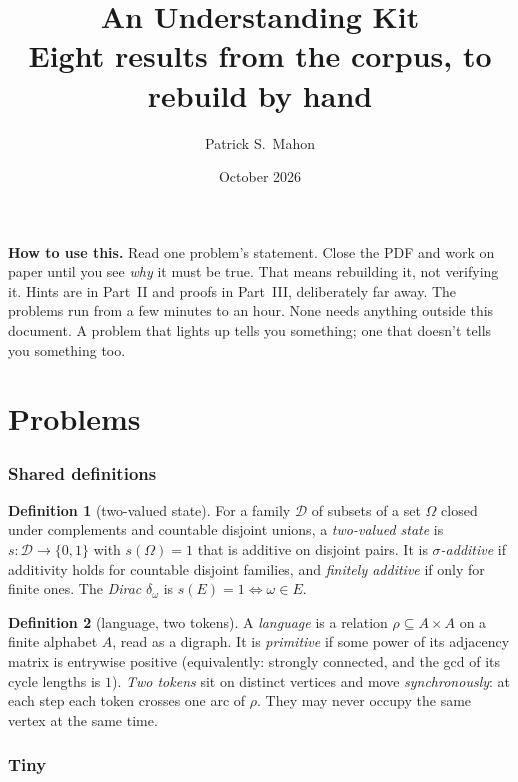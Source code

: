 \documentclass[11pt]{article}
\title{An Understanding Kit\\[2pt]\large Eight results from the corpus, to rebuild by hand}
\author{Patrick S.\ Mahon}
\date{October 2026}
\theoremstyle{definition}
\newtheorem{definition}{Definition}
\theoremstyle{remark}
\newcommand{\bp}[1]{\begin{mdframed}[backgroundcolor=black!4,linewidth=0.4pt]#1\end{mdframed}}
\begin{document}
\maketitle

\bp{\textbf{How to use this.} Read one problem's statement. Close the PDF and
work on paper until you see \emph{why} it must be true. That means rebuilding
it, not verifying it. Hints are in Part~II and proofs in Part~III, deliberately
far away. The problems run from a few minutes to an hour. None needs anything
outside this document. A problem that lights up tells you something; one that
doesn't tells you something too.}

\tableofcontents

\part{Problems}

\section*{Shared definitions}

\begin{definition}[two-valued state]
For a family $\mathcal D$ of subsets of a set $\Omega$ closed under complements
and countable disjoint unions, a \emph{two-valued state} is $s:\mathcal
D\to\{0,1\}$ with $s(\Omega)=1$ that is additive on disjoint pairs. It is
\emph{$\sigma$-additive} if additivity holds for countable disjoint families, and
\emph{finitely additive} if only for finite ones. The \emph{Dirac} $\delta_\omega$
is $s(E)=1\iff\omega\in E$.
\end{definition}

\begin{definition}[language, two tokens]
A \emph{language} is a relation $\rho\subseteq A\times A$ on a finite alphabet $A$,
read as a digraph. It is \emph{primitive} if some power of its adjacency matrix is
entrywise positive (equivalently: strongly connected, and the gcd of its cycle
lengths is $1$). \emph{Two tokens} sit on distinct vertices and move
\emph{synchronously}: at each step each token crosses one arc of $\rho$. They may
never occupy the same vertex at the same time.
\end{definition}

\section{Tiny}
\end{document}
